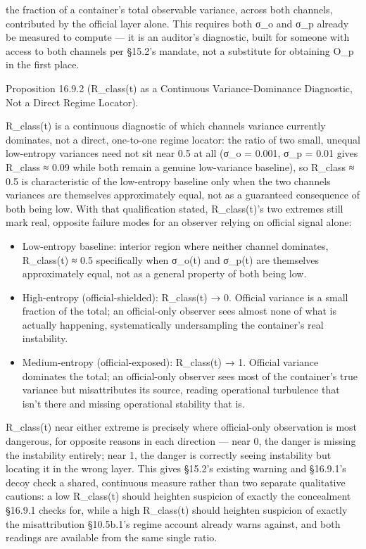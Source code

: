 \documentclass[
]{article}
\begin{document}
the fraction of a container's total observable variance, across both
channels, contributed by the official layer alone. This requires both
σ\_o and σ\_p already be measured to compute --- it is an auditor's
diagnostic, built for someone with access to both channels per §15.2's
mandate, not a substitute for obtaining O\_p in the first place.

Proposition 16.9.2 (R\_class(t) as a Continuous Variance-Dominance
Diagnostic, Not a Direct Regime Locator).

R\_class(t) is a continuous diagnostic of which channels variance
currently dominates, not a direct, one-to-one regime locator: the ratio
of two small, unequal low-entropy variances need not sit near 0.5 at all
(σ\_o = 0.001, σ\_p = 0.01 gives R\_class ≈ 0.09 while both remain a
genuine low-variance baseline), so R\_class ≈ 0.5 is characteristic of
the low-entropy baseline only when the two channels variances are
themselves approximately equal, not as a guaranteed consequence of both
being low. With that qualification stated, R\_class(t)'s two extremes
still mark real, opposite failure modes for an observer relying on
official signal alone:

\begin{itemize}
\item
  Low-entropy baseline: interior region where neither channel dominates,
  R\_class(t) ≈ 0.5 specifically when σ\_o(t) and σ\_p(t) are themselves
  approximately equal, not as a general property of both being low.
\item
  High-entropy (official-shielded): R\_class(t) → 0. Official variance
  is a small fraction of the total; an official-only observer sees
  almost none of what is actually happening, systematically
  undersampling the container's real instability.
\item
  Medium-entropy (official-exposed): R\_class(t) → 1. Official variance
  dominates the total; an official-only observer sees most of the
  container's true variance but misattributes its source, reading
  operational turbulence that isn't there and missing operational
  stability that is.
\end{itemize}

R\_class(t) near either extreme is precisely where official-only
observation is most dangerous, for opposite reasons in each direction
--- near 0, the danger is missing the instability entirely; near 1, the
danger is correctly seeing instability but locating it in the wrong
layer. This gives §15.2's existing warning and §16.9.1's decoy check a
shared, continuous measure rather than two separate qualitative
cautions: a low R\_class(t) should heighten suspicion of exactly the
concealment §16.9.1 checks for, while a high R\_class(t) should heighten
suspicion of exactly the misattribution §10.5b.1's regime account
already warns against, and both readings are available from the same
single ratio.
\end{document}
